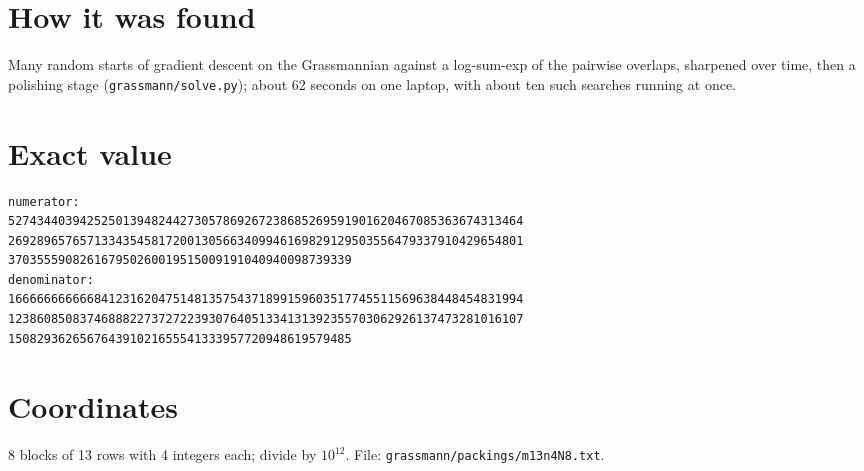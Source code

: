 \documentclass[11pt,a4paper]{article}
\begin{document}
\section{How it was found}
Many random starts of gradient descent on the Grassmannian against a log-sum-exp of the pairwise overlaps, sharpened over time, then a polishing stage (\texttt{grassmann/solve.py}); about 62 seconds on one laptop, with about ten such searches running at once.


\appendix
\section{Exact value}
{\small
\begin{verbatim}
numerator:
527434403942525013948244273057869267238685269591901620467085363674313464
269289657657133435458172001305663409946169829129503556479337910429654801
370355590826167950260019515009191040940098739339
denominator:
166666666666841231620475148135754371899159603517745511569638448454831994
123860850837468882273727223930764051334131392355703062926137473281016107
150829362656764391021655541333957720948619579485
\end{verbatim}}

\section{Coordinates}
8 blocks of 13 rows with 4 integers each; divide by $10^{12}$. File: \texttt{grassmann/packings/m13n4N8.txt}.
{\tiny
\begin{multicols}{3}
\end{multicols}}
\end{document}
